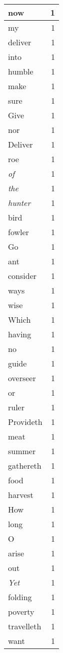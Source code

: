 \begin{center}
\begin{longtable}{l|r}
now & 1\\ \hline 
my & 1\\ \hline 
deliver & 1\\ \hline 
into & 1\\ \hline 
humble & 1\\ \hline 
make & 1\\ \hline 
sure & 1\\ \hline 
Give & 1\\ \hline 
nor & 1\\ \hline 
Deliver & 1\\ \hline 
roe & 1\\ \hline 
\emph{of} & 1\\ \hline 
\emph{the} & 1\\ \hline 
\emph{hunter} & 1\\ \hline 
bird & 1\\ \hline 
fowler & 1\\ \hline 
Go & 1\\ \hline 
ant & 1\\ \hline 
consider & 1\\ \hline 
ways & 1\\ \hline 
wise & 1\\ \hline 
Which & 1\\ \hline 
having & 1\\ \hline 
no & 1\\ \hline 
guide & 1\\ \hline 
overseer & 1\\ \hline 
or & 1\\ \hline 
ruler & 1\\ \hline 
Provideth & 1\\ \hline 
meat & 1\\ \hline 
summer & 1\\ \hline 
gathereth & 1\\ \hline 
food & 1\\ \hline 
harvest & 1\\ \hline 
How & 1\\ \hline 
long & 1\\ \hline 
O & 1\\ \hline 
arise & 1\\ \hline 
out & 1\\ \hline 
\emph{Yet} & 1\\ \hline 
folding & 1\\ \hline 
poverty & 1\\ \hline 
travelleth & 1\\ \hline 
want & 1\\ \hline 

\end{longtable}
\end{center}
